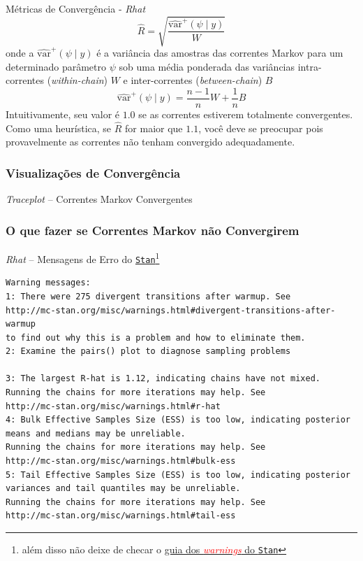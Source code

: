 \begin{frame}{Métricas de Convergência - \textit{Rhat} \parencite{gelman2013bayesian}}
  $$\widehat{R} = \sqrt{\frac{\widehat{\text{var}}^+(\psi \mid y)}{W}}$$
  onde a $\widehat{\text{var}}^+(\psi \mid y)$ é a variância das amostras das
  correntes Markov para um determinado parâmetro $\psi$ sob uma média ponderada
  das variâncias intra-correntes (\textit{within-chain}) $W$ e inter-correntes
  (\textit{between-chain}) $B$
  $$\widehat{\text{var}}^+(\psi \mid y) = \frac{n-1}{n} W + \frac{1}{n} B$$
  Intuitivamente, seu valor é $1.0$ se as correntes estiverem totalmente convergentes.
  Como uma heurística, se $\widehat{R}$ for maior que $1.1$, você deve se preocupar pois
  provavelmente as correntes não tenham convergido adequadamente.
\end{frame}

\subsubsection{Visualizações de Convergência}
\begin{frame}{\textit{Traceplot} -- Correntes Markov Convergentes}
  \begin{figure}
    \centering
    \resizebox{.4\linewidth}{!}{}
  \end{figure}
\end{frame}

\subsubsection{O que fazer se Correntes Markov não Convergirem}

\begin{frame}[fragile]{\textit{Rhat} -- Mensagens de Erro do \href{https://mc-stan.org}{\texttt{Stan}}\footnote{além disso não deixe de checar o \href{https://mc-stan.org/misc/warnings.html}{guia dos \textcolor{red}{\textit{warnings}} do \texttt{Stan}}}}
  \begin{lstlisting}[basicstyle=\footnotesize\color{red}]
Warning messages:
1: There were 275 divergent transitions after warmup. See
http://mc-stan.org/misc/warnings.html#divergent-transitions-after-warmup
to find out why this is a problem and how to eliminate them.
2: Examine the pairs() plot to diagnose sampling problems

3: The largest R-hat is 1.12, indicating chains have not mixed.
Running the chains for more iterations may help. See
http://mc-stan.org/misc/warnings.html#r-hat
4: Bulk Effective Samples Size (ESS) is too low, indicating posterior
means and medians may be unreliable.
Running the chains for more iterations may help. See
http://mc-stan.org/misc/warnings.html#bulk-ess
5: Tail Effective Samples Size (ESS) is too low, indicating posterior
variances and tail quantiles may be unreliable.
Running the chains for more iterations may help. See
http://mc-stan.org/misc/warnings.html#tail-ess
  \end{lstlisting}
\end{frame}

